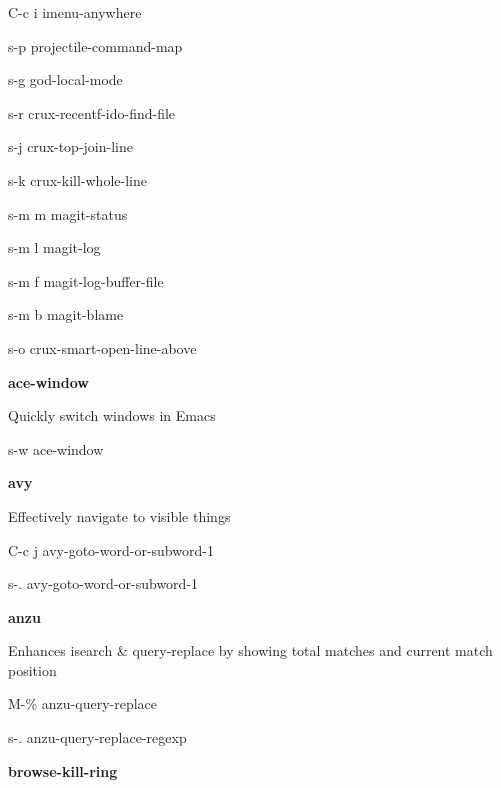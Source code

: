 \documentclass[10pt]{article}
\renewcommand\subsection[1]{\smallskip\par\textbf{\color{heading}#1}}
\newcommand\humanreadable[1]{{\par\color{default}\small\sffamily#1}}
\begin{document}
\begin{multicols}{4}
\begin{keylist}
  \item[C-c i] imenu-anywhere
  \item[s-p] projectile-command-map
  \item[s-g] god-local-mode
  \item[s-r] crux-recentf-ido-find-file
  \item[s-j] crux-top-join-line
  \item[s-k] crux-kill-whole-line
  \item[s-m m] magit-status
  \item[s-m l] magit-log
  \item[s-m f] magit-log-buffer-file
  \item[s-m b] magit-blame
  \item[s-o] crux-smart-open-line-above
  \end{keylist}

  \subsection{ace-window}
  \humanreadable{Quickly switch windows in Emacs}
  \begin{keylist}
  \item[s-w] ace-window
  \end{keylist}

  \subsection{avy}

  \humanreadable{Effectively navigate to visible things}
  \begin{keylist}
  \item[C-c j] avy-goto-word-or-subword-1
  \item[s-.] avy-goto-word-or-subword-1
  \end{keylist}
  \subsection{anzu}

  \humanreadable{Enhances isearch \& query-replace by showing total matches and current match position}
  \begin{keylist}
  \item[M-\%] anzu-query-replace
  \item[s-.] anzu-query-replace-regexp
  \end{keylist}

  \subsection{browse-kill-ring}


\end{multicols}
\end{document}

